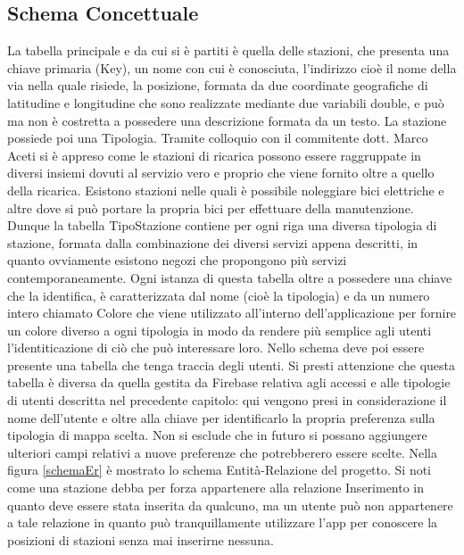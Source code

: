 \subsection{Schema Concettuale}
 La tabella principale e da cui si è partiti è
quella delle stazioni, che presenta una chiave primaria (Key), un nome con
cui è conosciuta, l'indirizzo cioè il nome della via nella quale risiede, la
posizione, formata da due coordinate geografiche di latitudine e longitudine che
sono realizzate mediante due variabili double, e
può ma non è costretta a possedere una descrizione formata da un testo. La
stazione possiede poi una Tipologia. Tramite colloquio con il commitente dott.
Marco  Aceti si è appreso come le stazioni di ricarica possono essere
raggruppate
in diversi insiemi dovuti al servizio vero e proprio che viene fornito oltre a
quello della ricarica. Esistono stazioni nelle quali è possibile noleggiare bici
elettriche e altre dove si può portare la propria bici per effettuare della manutenzione.
Dunque la tabella TipoStazione contiene per ogni riga una diversa tipologia di
stazione, formata dalla combinazione dei diversi servizi appena descritti, in
quanto ovviamente esistono negozi che propongono più servizi contemporaneamente.
Ogni istanza di questa tabella oltre a possedere una chiave che la identifica,
è caratterizzata dal nome (cioè la tipologia) e da un numero intero chiamato
Colore che viene utilizzato all'interno dell'applicazione per fornire un colore
diverso a ogni tipologia in modo da rendere più semplice agli utenti
l'identiticazione di ciò che può interessare loro. Nello schema deve poi essere
presente una tabella che tenga traccia degli utenti. Si presti attenzione che
questa tabella è diversa da quella gestita da Firebase relativa agli accessi e
alle tipologie di utenti descritta nel precedente capitolo: qui vengono presi in
considerazione il nome dell'utente e oltre alla chiave per identificarlo la
propria preferenza sulla tipologia di mappa scelta. Non si esclude che in futuro
si possano aggiungere ulteriori campi relativi a nuove preferenze che
potrebberero essere scelte. Nella figura \ref{schemaEr} è mostrato lo schema Entità-Relazione
del progetto. Si noti come una stazione debba per forza appartenere alla
relazione Inserimento in quanto deve essere stata inserita da qualcuno, ma un
utente può non appartenere a tale relazione in quanto può tranquillamente
utilizzare l'app per conoscere la posizioni di stazioni senza mai inserirne nessuna.

